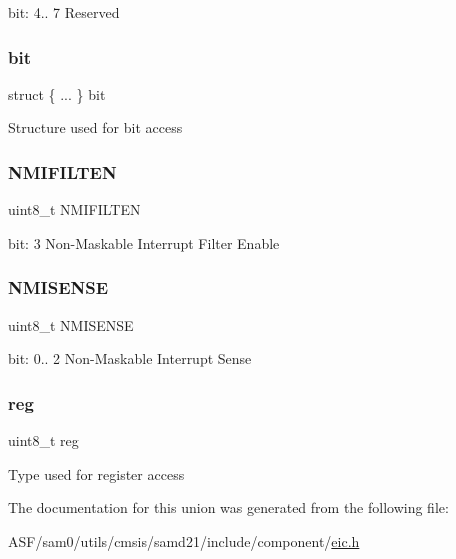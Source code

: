 bit\+: 4.. 7 Reserved \mbox{\label{union_e_i_c___n_m_i_c_t_r_l___type_a3d2f0ac51dea5c4bcdd9033def764133}} 
\subsubsection{\texorpdfstring{bit}{bit}}
{\footnotesize\ttfamily struct \{ ... \}   bit}

Structure used for bit access \mbox{\label{union_e_i_c___n_m_i_c_t_r_l___type_a3a31c9d0dd91e203dfab1e11af4c55bb}} 
\subsubsection{\texorpdfstring{NMIFILTEN}{NMIFILTEN}}
{\footnotesize\ttfamily uint8\+\_\+t N\+M\+I\+F\+I\+L\+T\+EN}

bit\+: 3 Non-\/\+Maskable Interrupt Filter Enable \mbox{\label{union_e_i_c___n_m_i_c_t_r_l___type_a0a2c6ace1f5336b3c57dbdf758221de1}} 
\subsubsection{\texorpdfstring{NMISENSE}{NMISENSE}}
{\footnotesize\ttfamily uint8\+\_\+t N\+M\+I\+S\+E\+N\+SE}

bit\+: 0.. 2 Non-\/\+Maskable Interrupt Sense \mbox{\label{union_e_i_c___n_m_i_c_t_r_l___type_a9428adc9af4653a2050e2536b55dec8d}} 
\subsubsection{\texorpdfstring{reg}{reg}}
{\footnotesize\ttfamily uint8\+\_\+t reg}

Type used for register access 

The documentation for this union was generated from the following file\+:\begin{DoxyCompactItemize}
\item 
A\+S\+F/sam0/utils/cmsis/samd21/include/component/\mbox{\hyperlink{component_2eic_8h}{eic.\+h}}\end{DoxyCompactItemize}
